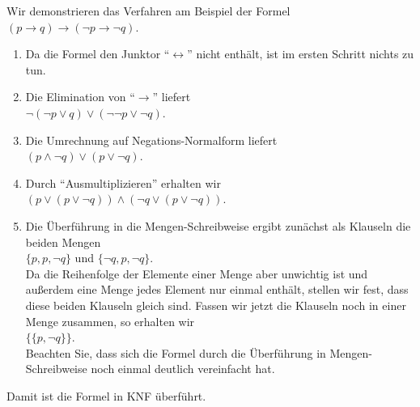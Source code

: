 Wir demonstrieren das Verfahren am Beispiel der Formel\\[0.2cm]
\hspace*{1.3cm} $(p \rightarrow q) \rightarrow (\neg p \rightarrow \neg q)$.
\begin{enumerate}
\item Da die Formel den Junktor ``$\leftrightarrow$'' nicht enth\"{a}lt,
      ist im ersten Schritt nichts zu tun.
\item Die Elimination von ``$\rightarrow$'' liefert \\[0.2cm]
      \hspace*{1.3cm} $\neg (\neg p \vee q) \vee (\neg \neg p \vee \neg q)$.
\item Die Umrechnung auf Negations-Normalform liefert \\[0.2cm]
      \hspace*{1.3cm} $(p \wedge \neg q) \vee (p \vee \neg q)$.
\item Durch ``Ausmultiplizieren'' erhalten wir \\[0.2cm]
      \hspace*{1.3cm} $(p \vee (p \vee \neg q)) \wedge (\neg q \vee (p \vee \neg q))$.
\item Die \"{U}berf\"{u}hrung in die Mengen-Schreibweise ergibt zun\"{a}chst als Klauseln die beiden Mengen \\[0.2cm]
      \hspace*{1.3cm} $\{p, p, \neg q\}$ \quad und \quad $\{\neg q,  p,  \neg q\}$. \\[0.2cm]
      Da die Reihenfolge der Elemente einer Menge aber unwichtig ist und au\ss{}erdem eine Menge
      jedes Element nur einmal enth\"{a}lt, stellen wir fest, dass diese beiden Klauseln gleich sind.
      Fassen wir jetzt die Klauseln noch in einer Menge zusammen, so erhalten wir \\[0.2cm]
      \hspace*{1.3cm} $\bigl\{ \{p, \neg q\} \bigr\}$. \\[0.2cm]
      Beachten Sie, dass sich die Formel durch die \"{U}berf\"{u}hrung in 
      Mengen-Schreibweise noch einmal deutlich vereinfacht hat.
\end{enumerate}
Damit ist die Formel in KNF \"{u}berf\"{u}hrt.


